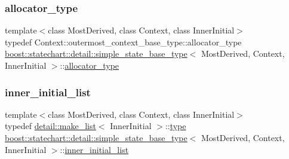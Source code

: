 \subsubsection{\texorpdfstring{allocator\+\_\+type}{allocator\_type}}
{\footnotesize\ttfamily template$<$class Most\+Derived, class Context, class Inner\+Initial$>$ \\
typedef Context\+::outermost\+\_\+context\+\_\+base\+\_\+type\+::allocator\+\_\+type \mbox{\hyperlink{structboost_1_1statechart_1_1detail_1_1simple__state__base__type}{boost\+::statechart\+::detail\+::simple\+\_\+state\+\_\+base\+\_\+type}}$<$ Most\+Derived, Context, Inner\+Initial $>$\+::\mbox{\hyperlink{structboost_1_1statechart_1_1detail_1_1simple__state__base__type_a435aafee614e28d33bab92dffc2e879b}{allocator\+\_\+type}}\hspace{0.3cm}{\ttfamily [private]}}

\mbox{\label{structboost_1_1statechart_1_1detail_1_1simple__state__base__type_aac74557aa49951c88f68f5b66470b679}} 
\subsubsection{\texorpdfstring{inner\+\_\+initial\+\_\+list}{inner\_initial\_list}}
{\footnotesize\ttfamily template$<$class Most\+Derived, class Context, class Inner\+Initial$>$ \\
typedef \mbox{\hyperlink{structboost_1_1statechart_1_1detail_1_1make__list}{detail\+::make\+\_\+list}}$<$ Inner\+Initial $>$\+::\mbox{\hyperlink{structboost_1_1statechart_1_1detail_1_1simple__state__base__type_af90a0a8f976dd22839145952facf37b7}{type}} \mbox{\hyperlink{structboost_1_1statechart_1_1detail_1_1simple__state__base__type}{boost\+::statechart\+::detail\+::simple\+\_\+state\+\_\+base\+\_\+type}}$<$ Most\+Derived, Context, Inner\+Initial $>$\+::\mbox{\hyperlink{structboost_1_1statechart_1_1detail_1_1simple__state__base__type_aac74557aa49951c88f68f5b66470b679}{inner\+\_\+initial\+\_\+list}}\hspace{0.3cm}{\ttfamily [private]}}

